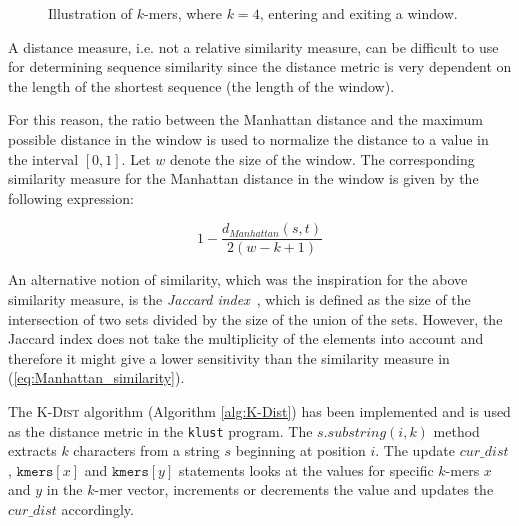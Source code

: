 \begin{figure}[H]
\centering
{}
\caption{Illustration of $k$-mers, where $k=4$, entering and exiting a window.}
\label{fig:d2_forward_differences}
\end{figure}

A distance measure, i.e. not a relative similarity measure, can be difficult to
use for determining sequence similarity since the distance metric is very
dependent on the length of the shortest sequence (the length of the window).

For this reason, the ratio between the Manhattan distance and the maximum
possible distance in the window is used to normalize the distance to a value in
the interval $[0,1]$. Let $w$ denote the size of the window. The corresponding
similarity measure for the Manhattan distance in the window is given by the
following expression:

\begin{equation}
  1 - \frac{d_{Manhattan}(s,t)}{2(w - k + 1)} \label{eq:Manhattan_similarity}
\end{equation}

An alternative notion of similarity, which was the inspiration for the above
similarity measure, is the \emph{Jaccard index}~\cite{jaccard1912}, which is
defined as the size of the intersection of two sets divided by the size of the
union of the sets.  However, the Jaccard index does not take the multiplicity
of the elements into account and therefore it might give a lower sensitivity
than the similarity measure in (\ref{eq:Manhattan_similarity}).

The \textsc{K-Dist} algorithm (Algorithm \ref{alg:K-Dist}) has been implemented
and is used as the distance metric in the \texttt{klust} program. The
$s.substring(i,k)$ method extracts $k$ characters from a string $s$ beginning
at position $i$. The update $cur\_dist$, $\mathtt{kmers}[x]$ and
$\mathtt{kmers}[y]$ statements looks at the values for specific $k$-mers $x$
and $y$ in the $k$-mer vector, increments or decrements the value and updates
the $cur\_dist$ accordingly.

